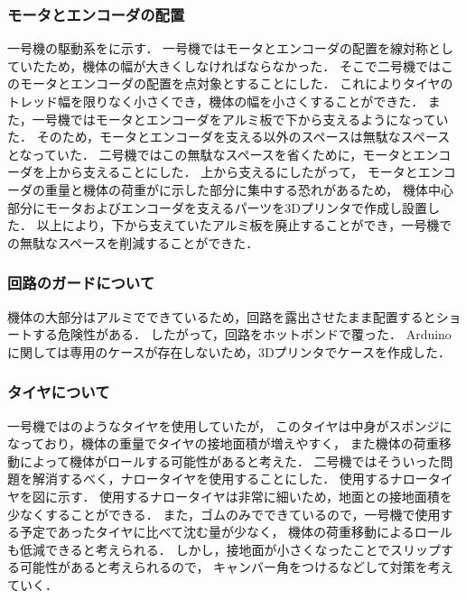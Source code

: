 \documentclass[11pt,a4]{jsarticle}
\begin{document}
    \subsubsection{モータとエンコーダの配置}
      一号機の駆動系をに示す．
      一号機ではモータとエンコーダの配置を線対称としていたため，機体の幅が大きくしなければならなかった．
      そこで二号機ではこのモータとエンコーダの配置を点対象とすることにした．
      これによりタイヤのトレッド幅を限りなく小さくでき，機体の幅を小さくすることができた．
      また，一号機ではモータとエンコーダをアルミ板で下から支えるようになっていた．
      そのため，モータとエンコーダを支える以外のスペースは無駄なスペースとなっていた．
      二号機ではこの無駄なスペースを省くために，モータとエンコーダを上から支えることにした．
      上から支えるにしたがって，
      モータとエンコーダの重量と機体の荷重がに示した部分に集中する恐れがあるため，
      機体中心部分にモータおよびエンコーダを支えるパーツを3Dプリンタで作成し設置した．
      以上により，下から支えていたアルミ板を廃止することができ，一号機での無駄なスペースを削減することができた．

    \subsubsection{回路のガードについて}
      機体の大部分はアルミでできているため，回路を露出させたまま配置するとショートする危険性がある．
      したがって，回路をホットボンドで覆った．
      Arduinoに関しては専用のケースが存在しないため，3Dプリンタでケースを作成した．

    \subsubsection{タイヤについて}
      一号機ではのようなタイヤを使用していたが，
      このタイヤは中身がスポンジになっており，機体の重量でタイヤの接地面積が増えやすく，
      また機体の荷重移動によって機体がロールする可能性があると考えた．
      二号機ではそういった問題を解消するべく，ナロータイヤを使用することにした．
      使用するナロータイヤを図に示す．
      使用するナロータイヤは非常に細いため，地面との接地面積を少なくすることができる．
      また，ゴムのみでできているので，一号機で使用する予定であったタイヤに比べて沈む量が少なく，
      機体の荷重移動によるロールも低減できると考えられる．
      しかし，接地面が小さくなったことでスリップする可能性があると考えられるので，
      キャンバー角をつけるなどして対策を考えていく．
\end{document}
